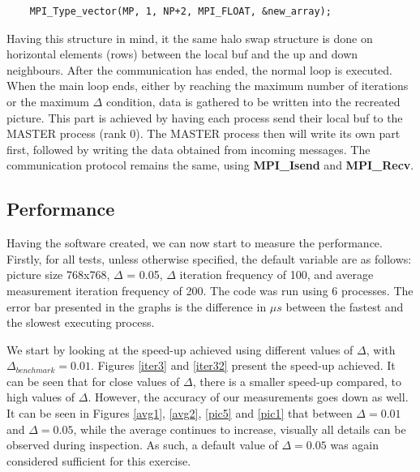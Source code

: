 \documentclass[11pt]{article}
\begin{document}
	\begin{lstlisting}
	MPI_Type_vector(MP, 1, NP+2, MPI_FLOAT, &new_array);
	\end{lstlisting}
	
	Having this structure in mind, it the same halo swap structure is done on horizontal elements (rows) between the local buf and the up and down neighbours. After the communication has ended, the normal loop is executed. When the main loop ends, either by reaching the maximum number of iterations or the maximum $\Delta$ condition, data is gathered to be written into the recreated picture. This part is achieved by having each process send their local buf to the MASTER process (rank 0). The MASTER process then will write its own part first, followed by writing the data obtained from incoming messages. The communication protocol remains the same, using \textbf{MPI\_Isend} and \textbf{MPI\_Recv}. 
	
	\subsection{Performance}
	
	Having the software created, we can now start to measure the performance. Firstly, for all tests, unless otherwise specified, the default variable are as follows: picture size 768x768, $\Delta$ = 0.05, $\Delta$ iteration frequency of 100, and average measurement iteration frequency of 200. The code was run using 6 processes. The error bar presented in the graphs is the difference in $\mu s$ between the fastest and the slowest executing process. 
	
	We start by looking at the speed-up achieved using different values of $\Delta$, with $\Delta_{benchmark}=0.01$. Figures \ref{iter3} and \ref{iter32} present the speed-up achieved. It can be seen that for close values of $\Delta$, there is a smaller speed-up compared, to high values of $\Delta$. However, the accuracy of our measurements goes down as well. It can be seen in Figures \ref{avg1}, \ref{avg2}, \ref{pic5} and \ref{pic1} that between $\Delta=0.01$ and $\Delta=0.05$, while the average continues to increase, visually all details can be observed during inspection. As such, a default value of $\Delta=0.05$ was again considered sufficient for this exercise. 
	
\end{document}

